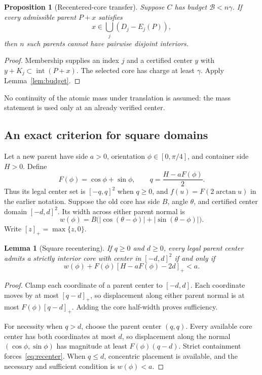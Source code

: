 \documentclass[11pt]{article}
\newtheorem{lemma}[theorem]{Lemma}
\newtheorem{proposition}[theorem]{Proposition}
\newcommand{\interior}{\operatorname{int}}
\newcommand{\abs}[1]{\left|#1\right|}
\begin{document}
\begin{proposition}[Recentered-core transfer]\label{prop:recenter}
Suppose $C$ has budget $\mathcal B<n\gamma$. If every admissible parent
$P+x$ satisfies
\[
  x\in\bigcup_j(D_j-E_j(P)),
\]
then $n$ such parents cannot have pairwise disjoint interiors.
\end{proposition}

\begin{proof}
Membership supplies an index $j$ and a certified center $y$ with
$y+K_j\subset\interior(P+x)$. The selected core has charge at least
$\gamma$. Apply Lemma~\ref{lem:budget}.
\end{proof}

No continuity of the atomic mass under translation is assumed: the mass
statement is used only at an already verified center.

\subsection{An exact criterion for square domains}

Let a new parent have side $a>0$, orientation $\phi\in[0,\pi/4]$, and
container side $H>0$. Define
\[
  F(\phi)=\cos\phi+\sin\phi,\qquad
  q=\frac{H-aF(\phi)}2.
\]
Thus its legal center set is $[-q,q]^2$ when $q\ge0$, and
$f(u)=F(2\arctan u)$ in the earlier notation. Suppose the old core has side
$B$, angle $\theta$, and certified center domain $[-d,d]^2$. Its width
across either parent normal is
\[
  w(\phi)=B\bigl(\abs{\cos(\theta-\phi)}+
                         \abs{\sin(\theta-\phi)}\bigr).
\]
Write $[z]_+=\max\{z,0\}$.

\begin{lemma}[Square recentering]\label{lem:recenter}
If $q\ge0$ and $d\ge0$, every legal parent center admits a strictly interior
core with center in $[-d,d]^2$ if and only if
\begin{equation}\label{eq:recenter}
  w(\phi)+F(\phi)[H-aF(\phi)-2d]_+<a.
\end{equation}
\end{lemma}

\begin{proof}
Clamp each coordinate of a parent center to $[-d,d]$. Each coordinate moves
by at most $[q-d]_+$, so displacement along either parent normal is at most
$F(\phi)[q-d]_+$. Adding the core half-width proves sufficiency.

For necessity when $q>d$, choose the parent center $(q,q)$. Every available
core center has both coordinates at most $d$, so displacement along the
normal $(\cos\phi,\sin\phi)$ has magnitude at least $F(\phi)(q-d)$.
Strict containment forces~\eqref{eq:recenter}. When $q\le d$, concentric
placement is available, and the necessary and sufficient condition is
$w(\phi)<a$.
\end{proof}
\end{document}
